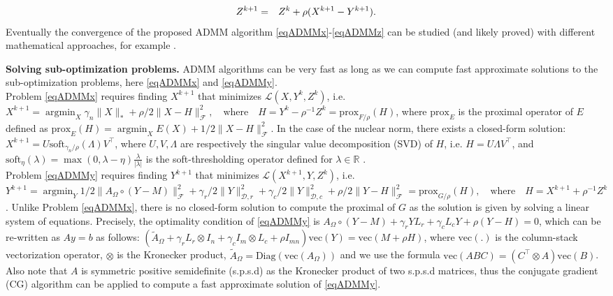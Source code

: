 \documentclass{article}
\DeclareMathOperator*{\argmin}{arg min}
\begin{document}
\vspace{-0.5cm}
\begin{eqnarray}
Z^{k+1} &=& Z^k + \rho ( X^{k+1} - Y^{k+1} ) \label{eqADMMz}.
\vspace{-0.1cm}
\end{eqnarray}
Eventually the convergence of the proposed ADMM algorithm \eqref{eqADMMx}-\eqref{eqADMMz} can be studied (and likely proved) with different mathematical approaches, for example \cite{cai2010singular}.







{\bf Solving sub-optimization problems.} ADMM algorithms can be very fast as long as we can compute fast approximate solutions to the sub-optimization problems, here \eqref{eqADMMx} and \eqref{eqADMMy}. \\
Problem \eqref{eqADMMx} requires finding $X^{k+1}$ that minimizes $\mathcal{L}(X,Y^k,Z^k)$, i.e. $X^{k+1} = \argmin_X \gamma_n \|X\|_* + \rho/2 \|X-H\|_\mathcal{F}^2,\quad \textrm{where}\quad H=Y^k-\rho^{-1}Z^k=\textrm{prox}_{ F/\rho } (H)$, where $\textrm{prox}_E$ is the proximal operator of $E$ defined as $\textrm{prox}_E(H)=\argmin_X E(X) + 1/2 \|X-H\|_\mathcal{F}^2$. In the case of the nuclear norm, there exists a closed-form solution: $X^{k+1} = U \textrm{soft}_{\gamma_n/\rho}(\Lambda) V^\top$, where $U,V,\Lambda$ are respectively the singular value decomposition (SVD) of $H$, i.e. $H=U \Lambda V^\top$, and $\textrm{soft}_\eta(\lambda)=\max(0,\lambda-\eta)\frac{\lambda}{|\lambda|}$ is the soft-thresholding operator defined for $\lambda\in\mathbb{R}$ \cite{cai2010singular}.\\
Problem \eqref{eqADMMy} requires finding $Y^{k+1}$ that minimizes $\mathcal{L}(X^{k+1},Y,Z^k)$, i.e. $Y^{k+1} = \argmin_Y 1/2\|A_\Omega \circ (Y-M)\|_\mathcal{F}^2 + \gamma_r/2 \|Y\|^2_{\mathcal{D},r} + \gamma_c/2 \|Y\|^2_{\mathcal{D},c} + \rho/2 \|Y-H\|_\mathcal{F}^2 = \textrm{prox}_{ G/\rho } (H),\quad \textrm{where}\quad H=X^{k+1}+\rho^{-1}Z^k$. Unlike Problem \eqref{eqADMMx}, there is no closed-form solution to compute the proximal of $G$ as the solution is given by solving a linear system of equations. Precisely, the optimality condition of \eqref{eqADMMy} is $A_\Omega \circ (Y-M) + \gamma_r Y L_r + \gamma_c L_c Y + \rho (Y - H) = 0$, which can be re-written as $Ay=b$ as follows: $( \tilde{A}_\Omega + \gamma_r   L_r \otimes I_n + \gamma_c  I_m \otimes L_c + \rho I_{mn} ) \textrm{vec}(Y) = \textrm{vec} ( M + \rho H )$, where $\textrm{vec}(.)$ is the column-stack vectorization operator, $\otimes$ is the Kronecker product, $\tilde{A}_\Omega=\textrm{Diag}(\textrm{vec}(A_\Omega))$ and we use the formula $\textrm{vec}(ABC) = (C^\top \otimes A) \textrm{vec}(B)$. Also note that $A$ is symmetric positive semidefinite (s.p.s.d) as the Kronecker product of two s.p.s.d matrices, thus the conjugate gradient (CG) algorithm can be applied to compute a fast approximate solution of \eqref{eqADMMy}.
\end{document}
